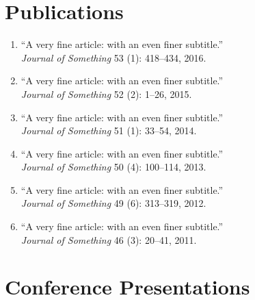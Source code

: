\documentclass[11pt]{article}
\begin{document}
\section*{Publications}

\setlength{\leftskip}{2em}

\vspace{.05in}

\begin{enumerate}[
  itemsep=-.45em,
  leftmargin=\dimexpr\leftmargini+1em\relax,
  labelindent=-1em,
  listparindent=-1em,
  itemindent=-1em
]
\item ``A very fine article: with an even finer subtitle.''\\
\emph{Journal of Something} 53 (1): 418--434, 2016.
\item ``A very fine article: with an even finer subtitle.''\\
\emph{Journal of Something} 52 (2): 1--26, 2015.
\item ``A very fine article: with an even finer subtitle.''\\
\emph{Journal of Something} 51 (1): 33--54, 2014.
\item ``A very fine article: with an even finer subtitle.''\\
\emph{Journal of Something} 50 (4): 100--114, 2013.
\item ``A very fine article: with an even finer subtitle.''\\
\emph{Journal of Something} 49 (6): 313--319, 2012.
\item ``A very fine article: with an even finer subtitle.''\\
\emph{Journal of Something} 46 (3): 20--41, 2011.
\end{enumerate}

\setlength{\leftskip}{0pt}
\vspace{.05in}

\section*{Conference Presentations}
\end{document}
